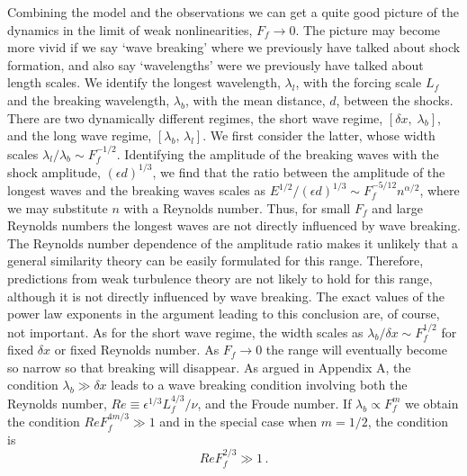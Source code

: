 Combining the model and the observations we can get a quite good picture of the
dynamics in the limit of weak nonlinearities, $ F_{f} \rightarrow 0 $. The
picture may become more vivid if we say `wave breaking' where we previously have
talked about shock formation, and also say `wavelengths' were we previously
have talked about length scales. We identify the longest wavelength, $
\lambda_l $, with the forcing scale $ L_f $ and the breaking wavelength, $
\lambda_b $, with the mean distance, $ d $, between the shocks. There are two
dynamically different regimes, the short wave regime, $ [\delta x, \;
\lambda_b] $, and the long wave regime, $ [\lambda_b, \, \lambda_l] $. We first
consider the latter, whose width scales $ \lambda_{l} /\lambda_b \sim
F_f^{-1/2} $. Identifying the amplitude of the breaking waves with the shock
amplitude, $ (\epsilon d)^{1/3} $, we find that the ratio between the amplitude of
the longest waves and the breaking waves scales as $ E^{1/2}/(\epsilon d)^{1/3}
\sim F_{f}^{-5/12} n^{\alpha/2} $, where we may substitute $ n $ with a
Reynolds number. Thus, for small $ F_f $ and large Reynolds
numbers the longest waves are not directly influenced by wave breaking. The
Reynolds number dependence of the amplitude ratio makes it unlikely that a
general similarity theory can be easily formulated for this range. Therefore,
predictions from weak turbulence theory \citep[for
example][]{ZakharovSagdeev1970} are not likely to hold for this range, although
it is not directly influenced by wave breaking. The exact values of the power
law exponents in the argument leading to this conclusion are, of course, not
important. As for the short wave regime, the width scales as $ \lambda_b
/\delta x \sim F_f^{1/2} $ for fixed $ \delta x $ or fixed Reynolds number. As
$ F_{f} \rightarrow 0 $ the range will eventually become so narrow so that
breaking will disappear. As argued in Appendix A, the condition $ \lambda_b \gg \delta x $ leads to a wave breaking condition involving both the Reynolds number,  $ Re  \equiv \epsilon^{1/3} L_f^{4/3} /  \nu $, and  the Froude number. If $ \lambda_b \propto F_f^{m} $ we obtain the condition $ Re F_f^{4m/3} \gg 1 $ and in the special case when $ m = 1/2 $, the condition is
\begin{equation} \label{WC}
Re F_f^{2/3} \gg 1 \, .
\end{equation}
